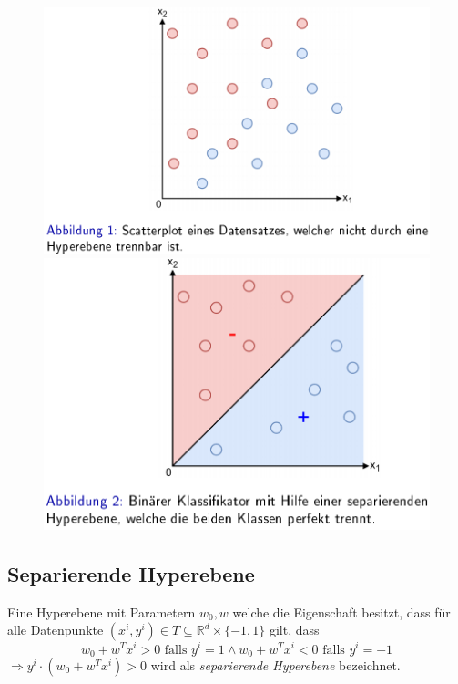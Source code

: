 \documentclass{report}
\begin{document}
\begin{figure}[H]
  \centering
  \begin{minipage}[b]{0.4\textwidth}
    \includegraphics[scale=.275]{ml06_1}
  \end{minipage}
  \hfill
  \begin{minipage}[b]{0.4\textwidth}
    \includegraphics[scale=.275]{ml06_2}
  \end{minipage}
\end{figure}

\subsection{Separierende Hyperebene}
Eine Hyperebene mit Parametern $w_0, w$ welche die Eigenschaft besitzt, dass für alle Datenpunkte
$(x^i, y^i)\in T\subseteq \mathbb{R}^d \times \{-1, 1\}$ gilt, dass
$$w_0 + w^Tx^i > 0 \text{ falls } y^i = 1 \land w_0 + w^Tx^i < 0 \text{ falls } y^i = -1$$
$\Rightarrow y^i\cdot (w_0 + w^Tx^i) > 0$ wird als \textit{separierende Hyperebene} bezeichnet.
\end{document}
